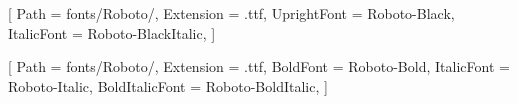 
\contourlength{0.8pt}

\renewcommand{\ULdepth}{3.8pt}

[
Path = fonts/Roboto/,
Extension = .ttf,
UprightFont = Roboto-Black,
ItalicFont = Roboto-BlackItalic,
]

\setmainfont{Roboto-Regular}[
Path = fonts/Roboto/,
Extension = .ttf,
BoldFont = Roboto-Bold,
ItalicFont = Roboto-Italic,
BoldItalicFont = Roboto-BoldItalic,
]